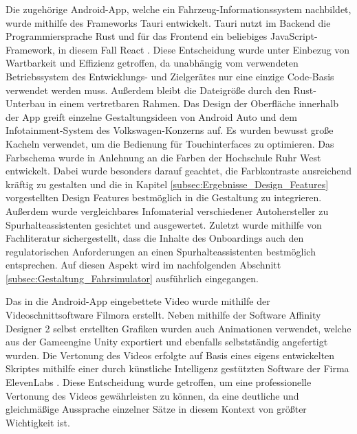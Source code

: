 Die zugehörige Android-App, welche ein Fahrzeug-Informationssystem nachbildet, wurde mithilfe des Frameworks Tauri \cite{tauri_dokumentation} entwickelt. Tauri nutzt im Backend die Programmiersprache Rust \cite{klabnik_rust} und für das Frontend ein beliebiges JavaScript-Framework, in diesem Fall React \cite{react_dokumentation}. Diese Entscheidung wurde unter Einbezug von Wartbarkeit und Effizienz getroffen, da unabhängig vom verwendeten Betriebssystem des Entwicklungs- und Zielgerätes nur eine einzige Code-Basis verwendet werden muss. Außerdem bleibt die Dateigröße durch den Rust-Unterbau in einem vertretbaren Rahmen. Das Design der Oberfläche innerhalb der App greift einzelne Gestaltungsideen von Android Auto \cite{google_android_auto} und dem Infotainment-System des Volkswagen-Konzerns \cite{volkswagen_infotainment} auf. Es wurden bewusst große Kacheln verwendet, um die Bedienung für Touchinterfaces zu optimieren. Das Farbschema wurde in Anlehnung an die Farben der Hochschule Ruhr West entwickelt. Dabei wurde besonders darauf geachtet, die Farbkontraste ausreichend kräftig zu gestalten und die in Kapitel \ref{subsec:Ergebnisse_Design_Features} vorgestellten Design Features bestmöglich in die Gestaltung zu integrieren. Außerdem wurde vergleichbares Infomaterial verschiedener Autohersteller \cite{audi_spurverlassenswarnung,ford_fahrspur_pilot_2021, kia_lane_keeping_assist_2024,mercedes_aktiver_spurhalte_assistent,volvo_pilot_assist_video_guide, volkswagen_lane_assist_2025, bmw_driver_assistance_settings_2025} zu Spurhalteassistenten gesichtet und ausgewertet. Zuletzt wurde mithilfe von Fachliteratur \cite{wisselmann2024querfuehrungsassistenz} sichergestellt, dass die Inhalte des Onboardings auch den regulatorischen Anforderungen an einen Spurhalteassistenten bestmöglich entsprechen. Auf diesen Aspekt wird im nachfolgenden Abschnitt \ref{subsec:Gestaltung_Fahrsimulator} ausführlich eingegangen.

Das in die Android-App eingebettete Video wurde mithilfe der Videoschnittsoftware Filmora \cite{wondershare_filmora} erstellt. Neben mithilfe der Software Affinity Designer 2 \cite{serif_affinity_designer2} selbst erstellten Grafiken wurden auch Animationen verwendet, welche aus der Gameengine Unity \cite{unity_engine} exportiert und ebenfalls selbstständig angefertigt wurden. Die Vertonung des Videos erfolgte auf Basis eines eigens entwickelten Skriptes mithilfe einer durch künstliche Intelligenz gestützten Software der Firma ElevenLabs \cite{elevenlabs_text_to_speech}. Diese Entscheidung wurde getroffen, um eine professionelle Vertonung des Videos gewährleisten zu können, da eine deutliche und gleichmäßige Aussprache einzelner Sätze in diesem Kontext von größter Wichtigkeit ist.


